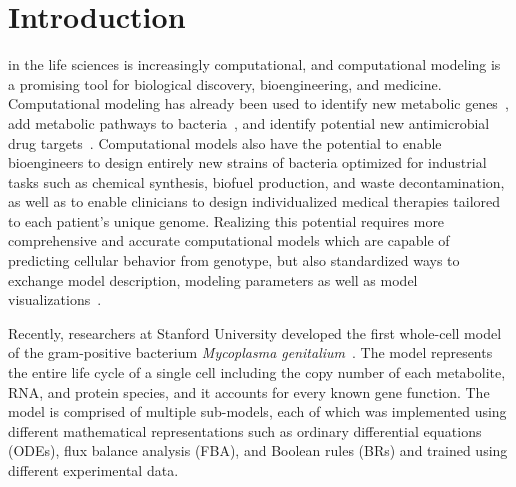 \documentclass[journal,transmag]{IEEEtran}
\begin{document}
\maketitle
\IEEEdisplaynontitleabstractindextext
\IEEEpeerreviewmaketitle

\section{Introduction}

% 
% 
% 
% 

 in the life sciences is increasingly computational, and computational modeling is a promising tool for biological discovery, bioengineering, and medicine. Computational modeling has already been used to identify new metabolic genes~\cite{Reed2006}, add metabolic pathways to bacteria~\cite{Lee2009}, and identify potential new antimicrobial drug targets~\cite{Lee2012}. 
Computational models also have the potential to enable bioengineers to design entirely new strains of bacteria optimized for industrial tasks such as chemical synthesis, biofuel production, and waste decontamination, as well as to enable clinicians to design individualized medical therapies tailored to each patient's unique genome. 
Realizing this potential requires more comprehensive and accurate computational models which are capable of predicting cellular behavior from genotype, but also standardized ways to exchange model description, modeling parameters as well as model visualizations~\cite{Macklin2014,Karr2015,Klipp07}.

Recently, researchers at Stanford University developed the first whole-cell model of the gram-positive bacterium \textit{Mycoplasma genitalium}~\cite{Karr2012}. 
The model represents the entire life cycle of a single cell including the copy number of each metabolite, RNA, and protein species, and it accounts for every known gene function. 
The model is comprised of multiple sub-models, each of which was implemented using different mathematical representations such as ordinary differential equations (ODEs), flux balance analysis (FBA), and Boolean rules (BRs) and trained using different experimental data. 
\end{document}
